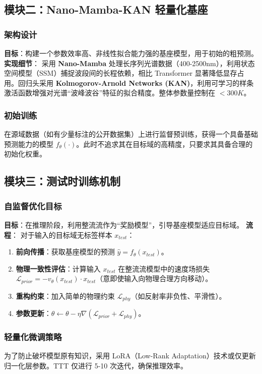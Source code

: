 \documentclass[12pt, a4paper]{article}
\begin{document}
\subsection{模块二：Nano-Mamba-KAN 轻量化基座}

\subsubsection{架构设计}
\textbf{目标}：构建一个参数效率高、非线性拟合能力强的基座模型，用于初始的粗预测。
\textbf{实现细节}：
采用 \textbf{Nano-Mamba} 处理长序列光谱数据（400-2500nm），利用状态空间模型（SSM）捕捉波段间的长程依赖，相比 Transformer 显著降低显存占用。回归头采用 \textbf{Kolmogorov-Arnold Networks (KAN)}，利用可学习的样条激活函数增强对光谱“波峰波谷”特征的拟合精度。整体参数量控制在 $<300K$。

\subsubsection{初始训练}
在源域数据（如有少量标注的公开数据集）上进行监督预训练，获得一个具备基础预测能力的模型 $f_\theta(\cdot)$。此时不追求其在目标域的高精度，只要求其具备合理的初始化权重。

\subsection{模块三：测试时训练机制}

\subsubsection{自监督优化目标}
\textbf{目标}：在推理阶段，利用整流流作为“奖励模型”，引导基座模型适应目标域。
\textbf{流程}：
对于输入的目标域无标签样本 $x_{test}$：
\begin{enumerate}
    \item \textbf{前向传播}：获取基座模型的预测 $\hat{y} = f_\theta(x_{test})$。
    \item \textbf{物理一致性评估}：计算输入 $x_{test}$ 在整流流模型中的速度场损失 $\mathcal{L}_{prior} = -v_\theta(x_{test}) \cdot x_{test}$（意即使输入向物理合理方向移动）。
    \item \textbf{重构约束}：加入简单的物理约束 $\mathcal{L}_{phy}$（如反射率非负性、平滑性）。
    \item \textbf{参数更新}：$\theta \leftarrow \theta - \eta \nabla (\mathcal{L}_{prior} + \mathcal{L}_{phy})$。
\end{enumerate}

\subsubsection{轻量化微调策略}
为了防止破坏模型原有知识，采用 LoRA（Low-Rank Adaptation）技术或仅更新归一化层参数。TTT 仅进行 5-10 次迭代，确保推理效率。
\end{document}
